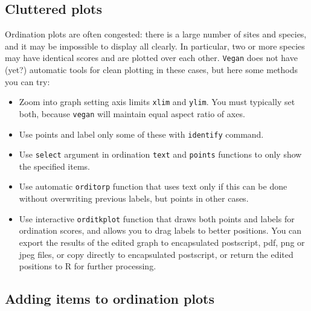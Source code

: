 \documentclass[a4paper,10pt]{amsart}
\begin{document}
\subsection{Cluttered plots}

Ordination plots are often congested: there is a large number of sites
and species, and it may be impossible to display all clearly.  In
particular, two or more species may have identical scores and are
plotted over each other.  \texttt{Vegan} does not have (yet?)
automatic tools for clean plotting in these cases, but here some
methods you can try:
\begin{itemize}
\item Zoom into graph setting axis limits \texttt{xlim} and
  \texttt{ylim}.  You must typically set both, because \texttt{vegan}
  will maintain equal aspect ratio of axes.
\item Use points and label only some of these with \texttt{identify}
  command.
\item Use \texttt{select} argument in ordination \texttt{text} and
  \texttt{points} functions to only show the specified items.
\item Use automatic \texttt{orditorp} function that uses text only if
  this can be done without overwriting previous labels, but points in
  other cases.
\item Use interactive \texttt{orditkplot} function that draws both
  points and labels for ordination scores, and allows you to drag labels
  to better positions. You can export the results of the edited graph to
  encapsulated postscript, pdf, png or jpeg files, or copy directly to
  encapsulated postscript, or return the edited positions to R for
  further processing.
\end{itemize}

\subsection{Adding items to ordination plots}
\end{document}
